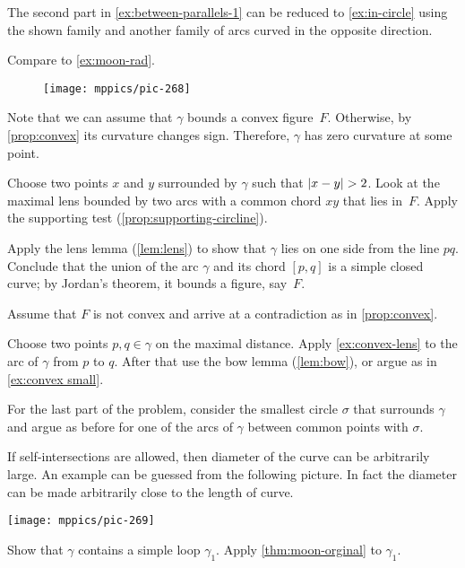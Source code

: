 \begin{multicols}{2}
The second part in \ref{ex:between-parallels-1} can be reduced to \ref{ex:in-circle} using the shown family and another family of arcs curved in the opposite direction.

 Compare to \ref{ex:moon-rad}.

\begin{wrapfigure}{r}{34 mm}
\vskip-6mm
\centering
\texttt{[image: mppics/pic-268]}
\vskip0mm
\end{wrapfigure}

Note that we can assume that $\gamma$ bounds a convex figure~$F$.
Otherwise, by \ref{prop:convex} its curvature changes sign.
Therefore, $\gamma$ has zero curvature at some point.

Choose two points $x$ and $y$ surrounded by $\gamma$ such that $|x\z-y|\z>2$.
Look at the maximal lens bounded by two arcs with a common chord $xy$ that lies in~$F$.
Apply the supporting test (\ref{prop:supporting-circline}).

Apply the lens lemma (\ref{lem:lens}) to show that $\gamma$ lies on one side from the line $pq$.
Conclude that the union of the arc $\gamma$ and its chord $[p,q]$ is a simple closed curve;
by Jordan's theorem, it bounds a figure, say~$F$.

Assume that $F$ is not convex and arrive at a contradiction as in \ref{prop:convex}. 

Choose two points $p,q\in\gamma$ on the maximal distance.
Apply \ref{ex:convex-lens} to the arc of $\gamma$ from $p$ to $q$.
After that use the bow lemma (\ref{lem:bow}), or argue as in \ref{ex:convex small}.

For the last part of the problem, consider the smallest circle $\sigma$ that surrounds $\gamma$ and argue as before for one of the arcs of $\gamma$ between common points with $\sigma$.

If self-intersections are allowed, then diameter of the curve can be arbitrarily large.
An example can be guessed from the following picture.
In fact the diameter can be made arbitrarily close to the length of curve.
\begin{Figure}
\vskip-0mm
\centering
\texttt{[image: mppics/pic-269]}
\vskip-0mm
\end{Figure}

Show that $\gamma$ contains a simple loop $\gamma_1$.
Apply \ref{thm:moon-orginal} to $\gamma_1$.


\end{multicols}
